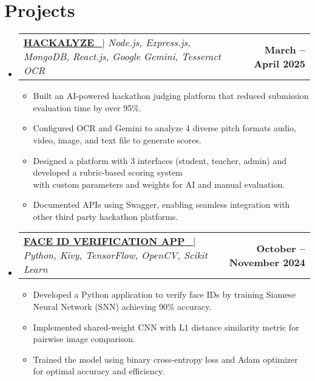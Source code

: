 \documentclass[letterpaper,11pt]{article}
\makeatletter
\newcommand{\resumeItem}[1]{
  \item\small{
    {#1 \vspace{-2pt}}
  }
}
\newcommand{\resumeProjectHeading}[2]{
    \item
    \begin{tabular*}{1.001\textwidth}{l@{\extracolsep{\fill}}r}
      \small#1 & \textbf{\small #2}\\
    \end{tabular*}\vspace{-7pt}
}
\newcommand{\resumeSubHeadingListStart}{\begin{itemize}[leftmargin=0.0in, label={}]}
\newcommand{\resumeSubHeadingListEnd}{\end{itemize}}
\newcommand{\resumeItemListStart}{\begin{itemize}}
\newcommand{\resumeItemListEnd}{\end{itemize}\vspace{-5pt}}
\makeatother
\begin{document}
\section{Projects}
    \vspace{-5pt}
    \resumeSubHeadingListStart
      \resumeProjectHeading
          {\href{https://github.com/Yasharya007/Hackalyze}{\textbf{HACKALYZE} \faGithub\ }$|$ \emph{Node.js, Express.js, MongoDB, React.js, Google Gemini, Tesseract OCR}}{March -- April 2025}
          \resumeItemListStart
            \resumeItem{Built an AI-powered hackathon judging platform that reduced submission evaluation time by over 95\%.}\vspace{2pt}
            \resumeItem{Configured OCR and Gemini to analyze 4 diverse pitch formats audio, video, image, and text file to generate scores.}\vspace{2pt}
            \resumeItem{Designed a platform with 3 interfaces (student, teacher, admin) and developed a rubric-based scoring system\\ with custom parameters and weights for AI and manual evaluation. }\vspace{2pt}
            \resumeItem{Documented APIs using Swagger, enabling seamless integration with other third party hackathon platforms.}
          \resumeItemListEnd
          \vspace{-13pt}
      \resumeProjectHeading
          {\href{https://github.com/Yasharya007/FaceID-Verification}{\textbf{FACE ID VERIFICATION APP} \faGithub\ }$|$ \emph{Python, Kivy, TensorFlow, OpenCV, Scikit Learn}}{October -- November 2024}
          \resumeItemListStart
            \resumeItem{Developed a Python application to verify face IDs by training Siamese Neural Network (SNN) achieving 90\% accuracy.}\vspace{2pt}
            \resumeItem{Implemented shared-weight CNN with L1 distance  similarity metric for pairwise image comparison.}\vspace{2pt}
            \resumeItem{Trained the model using binary cross-entropy loss and Adam optimizer for optimal accuracy and efficiency.}
          \resumeItemListEnd 
 
    \resumeSubHeadingListEnd
\vspace{-12pt}

\end{document}

